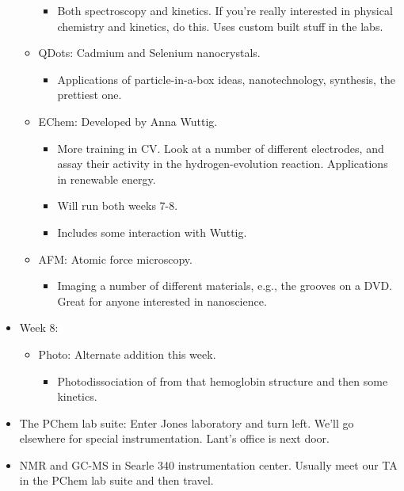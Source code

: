 \documentclass[../notes.tex]{subfiles}
\begin{document}
\begin{itemize}
\begin{itemize}
        \begin{itemize}
            \item Both spectroscopy and kinetics. If you're really interested in physical chemistry and kinetics, do this. Uses custom built stuff in the labs.
        \end{itemize}
        \item QDots: Cadmium and Selenium nanocrystals.
        \begin{itemize}
            \item Applications of particle-in-a-box ideas, nanotechnology, synthesis, the prettiest one.
        \end{itemize}
        \item EChem: Developed by Anna Wuttig.
        \begin{itemize}
            \item More training in CV. Look at a number of different electrodes, and assay their activity in the hydrogen-evolution reaction. Applications in renewable energy.
            \item Will run both weeks 7-8.
            \item Includes some interaction with Wuttig.
        \end{itemize}
        \item AFM: Atomic force microscopy.
        \begin{itemize}
            \item Imaging a number of different materials, e.g., the grooves on a DVD. Great for anyone interested in nanoscience.
        \end{itemize}
    \end{itemize}
    \item Week 8:
    \begin{itemize}
        \item Photo: Alternate addition this week.
        \begin{itemize}
            \item Photodissociation of  from that hemoglobin structure and then some kinetics.
        \end{itemize}
    \end{itemize}
    \item The PChem lab suite: Enter Jones laboratory and turn left. We'll go elsewhere for special instrumentation. Lant's office is next door.
    \item NMR and GC-MS in Searle 340 instrumentation center. Usually meet our TA in the PChem lab suite and then travel.

\end{itemize}
\end{document}
